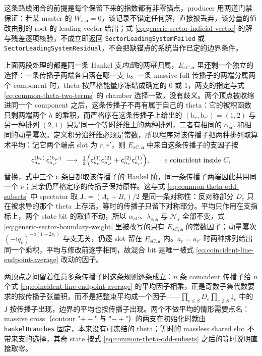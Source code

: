 \documentclass[11pt,a4paper]{ctexart}
\newcommand{\ii}{\mathrm i}
\newcommand{\cN}{\mathcal N}
\begin{document}
这条路线闭合的前提是每个保留下来的指数都有非零锚点，producer 用两道门禁保证：若某 master 的 $W_{s,\bm a}=0$，该记录不锚定任何解，直接被丢弃，该分量的值改由别的 root 的 leading vector 给出；式 \eqref{eq:generic-sector-indicial-vector} 的解与残差逐项核验，不成立即返回 \texttt{SectorLeadingSystemFailed} 或 \texttt{SectorLeadingSystemResidual}，不会把缺锚点的系统当作已定的边界条件。

上面两段处理的都是同一条 Hankel 支\emph{内部}的两幂归属，$E_{sC,\bm a}$ 里还剩一个独立的选择：一条传播子两端各自落在哪一支 $\mathrm b$。一条 massive full 传播子的两端分属两个 component 时，theta 按严格能量序冻结成确定的 $0$ 或 $1$，两支的指定与式 \eqref{eq:common-theta-two-terms} 的 chamber 选择一致，没有歧义。两个顶点被收缩进同一个 component 之后，这条传播子不再有属于自己的 theta：它的被积函数只剩两端两个 $h$ 的乘积，而严格序在这条传播子上给出的 $(\mathrm b_r,\mathrm b_{r'})=(1,2)$ 与另一种排列 $(2,1)$ 只是同一个等时纤维上的两种排列，二者有相同的 $\alpha_{sC}$ 和相同的动量幂次。定义积分沿纤维必须是常数，所以程序对该传播子把两种排列取算术平均：记它两个端点 slot 为 $r,r'$，则 $E_{sC,\bm a}$ 中来自这条传播子的支因子按
\begin{equation}
 \mathsf c^{(\mathrm b_r)}_{a_r}\,\mathsf c^{(\mathrm b_{r'})}_{a_{r'}}
 \ \longrightarrow\
 \tfrac12\Bigl(\mathsf c^{(1)}_{a_r}\mathsf c^{(2)}_{a_{r'}}
 +\mathsf c^{(2)}_{a_r}\mathsf c^{(1)}_{a_{r'}}\Bigr),
 \qquad e\ \text{coincident inside }C,
 \label{eq:coincident-line-endpoint-average}
\end{equation}
替换，式中三个 $\mathsf c$ 条目都取该传播子的 Hankel 阶，同一条传播子两端因此共用同一个 $\nu$；其余仍严格定序的传播子保持原样。这与式 \eqref{eq:common-theta-odd-subsets} 中 spectator 取 $\mathsf J_e=(A_e+B_e)/2$ 是同一条对称性：反对称部分 $D_e$ 只在被求导的那个 theta 上存活，等时的传播子只留下对称部分。平均只作用在支指标上，两个 state bit 的取值不动，所以 $\alpha_{sC}$、$\lambda_{s,\bm a}$ 与 $\cN_s$ 全部不变，式 \eqref{eq:generic-sector-boundary-weight} 里被改写的只有 $E_{sC,\bm a}$ 的常数因子；动量幂次 $(-\ii q_e)^{-a(1-2\nu_e)}$ 与支无关，仍逐 slot 留在 $E_{sC,\bm a}$ 内。$a_r=a_{r'}$ 时两种排列给出同一个乘积，平均与修改前逐字相同，故混合 bit 是唯一被式 \eqref{eq:coincident-line-endpoint-average} 改动的因子。

两顶点之间留着任意多条传播子时这条规则逐条成立：$n$ 条 coincident 传播子给 $n$ 个式 \eqref{eq:coincident-line-endpoint-average} 的平均因子相乘，正是奇数子集代数要求的按传播子张量积，而不是把整束平均成一个因子——$\prod_{e\in S}D_e\prod_{e\notin S}\mathsf J_e$ 中的 $\mathsf J$ 按传播子出现，边界的平均也按传播子出现。两个不做平均的情形需要点名：massive cross（contour "$+-$" 与 "$-+$"）的两支在初始化时就由 \texttt{hankelBranches} 固定，本来没有可冻结的 theta；等时的 massless shared slot 不带来支的选择，其奇 state 按式 \eqref{eq:common-theta-odd-subsets} 之后的等时说明直接取零。
\end{document}
